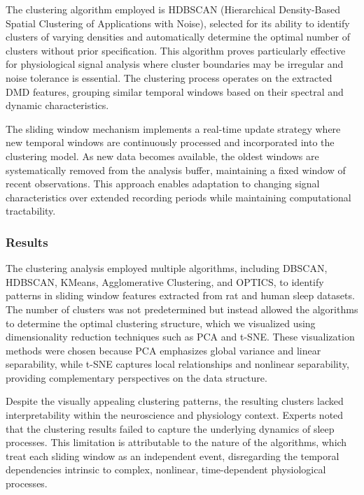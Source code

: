 \documentclass[a4paper,12pt,twoside]{article}
\begin{document}
The clustering algorithm employed is HDBSCAN (Hierarchical Density-Based Spatial Clustering of Applications with Noise), selected for its ability to identify clusters of varying densities and automatically determine the optimal number of clusters without prior specification. This algorithm proves particularly effective for physiological signal analysis where cluster boundaries may be irregular and noise tolerance is essential. The clustering process operates on the extracted DMD features, grouping similar temporal windows based on their spectral and dynamic characteristics.

The sliding window mechanism implements a real-time update strategy where new temporal windows are continuously processed and incorporated into the clustering model. As new data becomes available, the oldest windows are systematically removed from the analysis buffer, maintaining a fixed window of recent observations. This approach enables adaptation to changing signal characteristics over extended recording periods while maintaining computational tractability.





\subsubsection{Results}

The clustering analysis employed multiple algorithms, including DBSCAN, HDBSCAN, KMeans, Agglomerative Clustering, and OPTICS, to identify patterns in sliding window features extracted from rat and human sleep datasets. The number of clusters was not predetermined but instead allowed the algorithms to determine the optimal clustering structure, which we visualized using dimensionality reduction techniques such as PCA and t-SNE. These visualization methods were chosen because PCA emphasizes global variance and linear separability, while t-SNE captures local relationships and nonlinear separability, providing complementary perspectives on the data structure.

Despite the visually appealing clustering patterns, the resulting clusters lacked interpretability within the neuroscience and physiology context. Experts noted that the clustering results failed to capture the underlying dynamics of sleep processes. This limitation is attributable to the nature of the algorithms, which treat each sliding window as an independent event, disregarding the temporal dependencies intrinsic to complex, nonlinear, time-dependent physiological processes.
\end{document}
